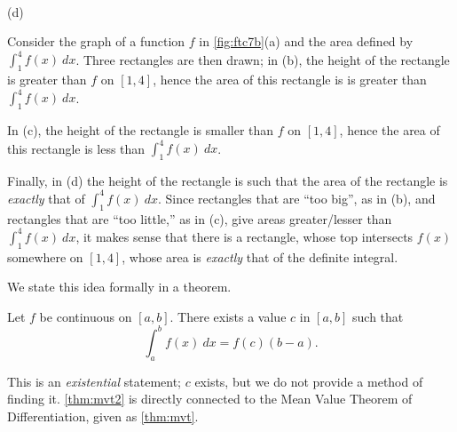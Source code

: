 {
\\(d)}

Consider the graph of a function $f$ in \autoref{fig:ftc7b}(a) and the area defined by $\int_1^4 f(x)\ dx$. Three rectangles are then drawn; in (b), the height of the rectangle is greater than $f$ on $[1,4]$, hence the area of this rectangle is is greater than $\int_1^4 f(x)\ dx$. 

In (c), the height of the rectangle is smaller than $f$ on $[1,4]$, hence the area of this rectangle is less than $\int_1^4 f(x)\ dx$.

Finally, in (d) the height of the rectangle is such that the area of the rectangle is \textit{exactly} that of $\int_1^4 f(x)\ dx$. Since rectangles that are ``too big\primeskip'', as in (b), and rectangles that are ``too little,'' as in (c), give areas greater/lesser than $\int_1^4 f(x)\ dx$, it makes sense that there is a rectangle, whose top intersects $f(x)$ somewhere on $[1,4]$, whose area is \textit{exactly} that of the definite integral.

We state this idea formally in a theorem.

{Let $f$ be continuous on $[a,b]$. There exists a value $c$ in $[a,b]$ such that
\[\int_a^bf(x)\ dx = f(c)(b-a).\]}

This is an \emph{existential} statement; $c$ exists, but we do not provide a method of finding it. \autoref{thm:mvt2} is directly connected to the Mean Value Theorem of Differentiation, given %
as \autoref{thm:mvt}. %

